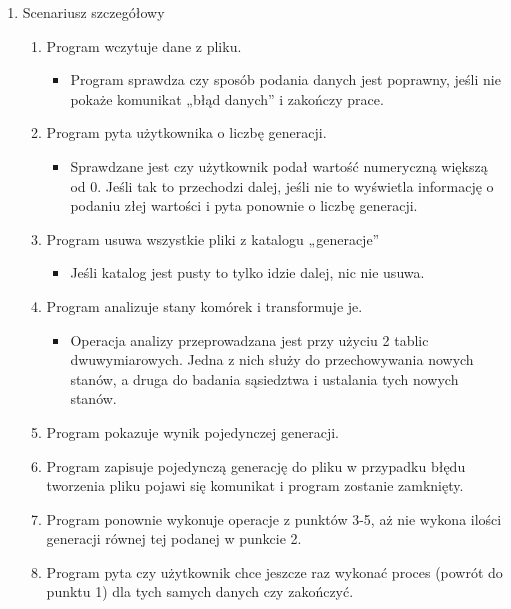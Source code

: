 \documentclass[11pt]{article}
\begin{document}
\begin{enumerate}
\begin{enumerate}[label=\arabic{enumi}.\arabic*.]
\item Scenariusz szczegółowy
\begin{enumerate}[label*=\arabic*.]
\item Program wczytuje dane z pliku. 
\begin{itemize}
\item Program sprawdza czy sposób podania danych jest poprawny, jeśli nie pokaże komunikat „błąd danych” i zakończy prace.
\end{itemize}
\item Program pyta użytkownika o liczbę generacji. 
\begin{itemize}
\item Sprawdzane jest czy użytkownik podał wartość numeryczną większą od 0. Jeśli tak to przechodzi dalej, jeśli nie to wyświetla informację o podaniu złej wartości i pyta ponownie o liczbę generacji.
\end{itemize}
\item Program usuwa wszystkie pliki z katalogu „generacje”
\begin{itemize}
\item Jeśli katalog jest pusty to tylko idzie dalej, nic nie usuwa.
\end{itemize}
\item Program analizuje stany komórek i transformuje je. 
\begin{itemize}
\item Operacja analizy przeprowadzana jest przy użyciu 2 tablic dwuwymiarowych. Jedna z nich służy do przechowywania nowych stanów, a druga do badania sąsiedztwa i ustalania tych nowych stanów.
\end{itemize}
\item Program pokazuje wynik pojedynczej generacji.
\item Program zapisuje pojedynczą generację do pliku w przypadku błędu tworzenia pliku pojawi się komunikat i program zostanie zamknięty.
\item Program ponownie wykonuje operacje z punktów 3-5, aż nie wykona ilości generacji równej tej podanej w punkcie 2.
\item Program pyta czy użytkownik chce jeszcze raz wykonać proces (powrót do punktu 1) dla tych samych danych czy zakończyć.
\end{enumerate}







\end{enumerate}





\end{enumerate}
\end{document}
